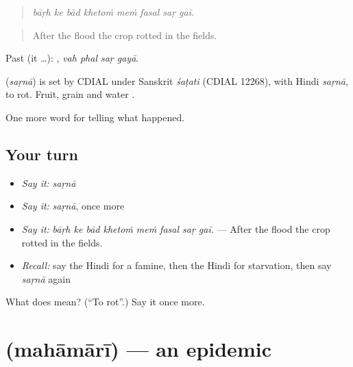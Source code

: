 \begin{quote}
       
\end{quote}

\begin{quote}
\emph{bāṛh ke bād khetoṁ meṁ fasal saṛ gaī.}
\end{quote}

\begin{quote}
After the flood the crop rotted in the fields.
\end{quote}

Past (it …):    , \emph{vah phal saṛ gayā}.

\begin{cousinweb}
\textbf{} (\emph{saṛnā}) is set by CDIAL under Sanskrit \emph{śaṭati} (CDIAL 12268), with Hindi \emph{saṛnā}, to rot. Fruit, grain and water \textbf{ }.
\end{cousinweb}

\begin{grammarlens}[title={What you've built}]
One more word for telling what happened.
\end{grammarlens}

\subsection*{Your turn}
\begin{itemize}
\raggedright
  \item \emph{Say it:} \emph{saṛnā}
  \item \emph{Say it:} \emph{saṛnā}, once more
  \item \emph{Say it:} \emph{bāṛh ke bād khetoṁ meṁ fasal saṛ gaī.} — After the flood the crop rotted in the fields.
  \item \emph{Recall:} say the Hindi for a famine, then the Hindi for starvation, then say \emph{saṛnā} again
\end{itemize}

\begin{tcolorbox}[breakable,colback=teal!4,colframe=teal!35!black,title={Before you move on}]
What does  mean? (\textquotedblleft{}To rot\textquotedblright{}.) Say it once more.
\end{tcolorbox}
\section[\texorpdfstring{\hi{महामारी} (mahāmārī)}{महामारी (mahāmārī)}]{ (mahāmārī) — an epidemic}

